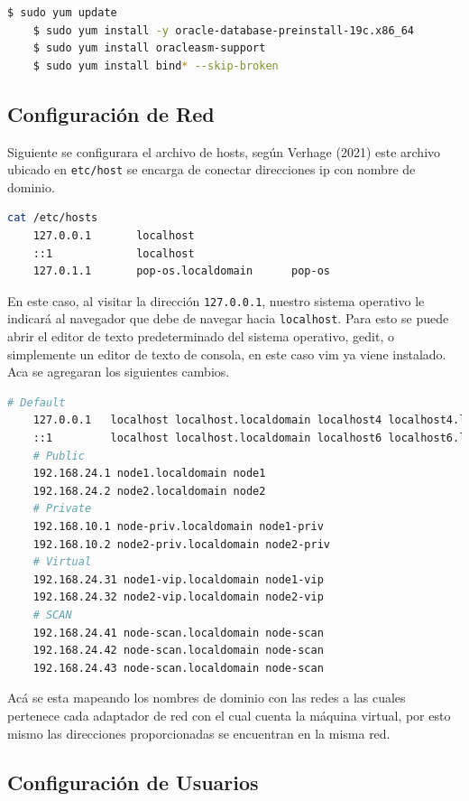 \documentclass{article}
\begin{document}
\begin{lstlisting}[style=mystyle,language=bash]
	$ sudo yum update
	$ sudo yum install -y oracle-database-preinstall-19c.x86_64
	$ sudo yum install oracleasm-support
	$ sudo yum install bind* --skip-broken
\end{lstlisting}

\subsection{Configuración de Red}

Siguiente se configurara el archivo de hosts, según Verhage (2021) este archivo ubicado en \texttt{etc/host} se encarga de conectar direcciones ip con nombre de dominio.

\begin{lstlisting}[style=mystyle,language=bash]
	cat /etc/hosts
	127.0.0.1   	localhost
	::1         	localhost
	127.0.1.1   	pop-os.localdomain  	pop-os
\end{lstlisting}

En este caso, al visitar la dirección \texttt{127.0.0.1}, nuestro sistema operativo le indicará al navegador que debe de navegar hacia \texttt{localhost}. Para esto se puede abrir el editor de texto predeterminado del sistema operativo, gedit, o simplemente un editor de texto de consola, en este caso vim ya viene instalado. Aca se agregaran los siguientes cambios.

\begin{lstlisting}[style=mystyle,language=bash]
	# Default
	127.0.0.1   localhost localhost.localdomain localhost4 localhost4.localdomain4
	::1     	localhost localhost.localdomain localhost6 localhost6.localdomain6
	# Public
	192.168.24.1 node1.localdomain node1
	192.168.24.2 node2.localdomain node2
	# Private
	192.168.10.1 node-priv.localdomain node1-priv
	192.168.10.2 node2-priv.localdomain node2-priv
	# Virtual
	192.168.24.31 node1-vip.localdomain node1-vip
	192.168.24.32 node2-vip.localdomain node2-vip
	# SCAN
	192.168.24.41 node-scan.localdomain node-scan
	192.168.24.42 node-scan.localdomain node-scan
	192.168.24.43 node-scan.localdomain node-scan
\end{lstlisting}

Acá se esta mapeando los nombres de dominio con las redes a las cuales pertenece cada adaptador de red con el cual cuenta la máquina virtual, por esto mismo las direcciones proporcionadas se encuentran en la misma red.

\subsection{Configuración de Usuarios}
\end{document}
